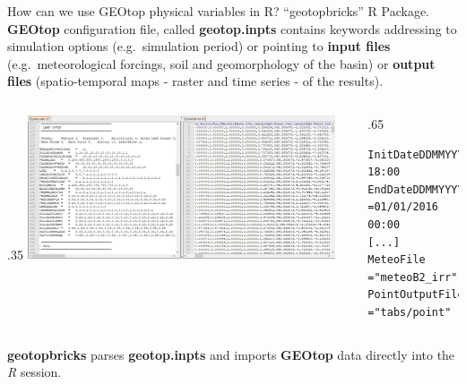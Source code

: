 \documentclass[
  ignorenonframetext,
]{beamer}
\def\begincols{\begin{columns}}
\def\begincol{\begin{column}}
\def\endcol{\end{column}}
\def\endcols{\end{columns}}
\begin{document}
\begin{frame}[fragile]{How can we use GEOtop physical variables in R?
``geotopbricks'' R Package.}
\protect\hypertarget{how-can-we-use-geotop-physical-variables-in-r-geotopbricks-r-package.}{}
\textbf{GEOtop} configuration file, called \textbf{geotop.inpts}
contains keywords addressing to simulation options (e.g.~simulation
period) or pointing to \textbf{input files} (e.g.~meteorological
forcings, soil and geomorphology of the basin) or \textbf{output files}
(spatio-temporal maps - raster and time series - of the results).
\begincols \begincol{.35\textwidth}
\includegraphics[width=0.9\textwidth,height=\textheight]{resources/images/Capture_IO_GEOtopJPG.JPG}\\

\endcol
\begincol{.65\textwidth}

\begin{verbatim}
InitDateDDMMYYYYhhmm=09/04/2014 18:00  
EndDateDDMMYYYYhhmm =01/01/2016 00:00 
[...] 
MeteoFile           ="meteoB2_irr" 
PointOutputFile     ="tabs/point" 
\end{verbatim}

\endcol
\endcols

\textbf{geotopbricks} parses \textbf{geotop.inpts} and imports
\textbf{GEOtop} data directly into the \emph{R} session.
\end{frame}
\end{document}
